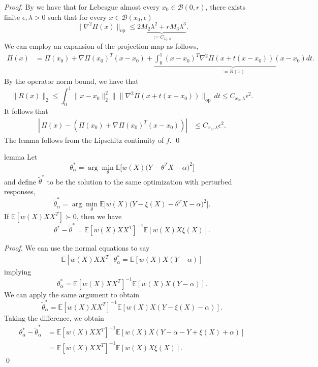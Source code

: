 \documentclass[11pt]{article}
\begin{document}
\noindent \textit{Proof.} By  we have that for Lebesgue almost every $x_0 \in \mathcal{B}(0,r)$, there exists finite $\epsilon, \lambda > 0$ such that for every $x \in \mathcal{B}(x_0, \epsilon)$
\[\|\nabla^2\Pi(x)\|_{\text{op}} \leq \underbrace{2M_2\lambda^{2}+rM_3\lambda^{3}}_{:= C_{x_0, \lambda}}.\]
We can employ an expansion of the projection map as follows,
\begin{align*}
    \Pi(x) &= \Pi(x_0) + \nabla\Pi(x_0)^{T}(x-x_0) + \underbrace{\int_{0}^{1}(x-x_0)^T\nabla^2\Pi(x+t(x-x_0))(x-x_0) dt}_{:= R(x)}.
\end{align*}
By the operator norm bound, we have that
\[\|R(x)\|_2 \leq \int_{0}^{1}\|x - x_0\|_2^2\|\|\nabla^2\Pi(x+t(x-x_0))\|_{\text{op}} \,dt \leq C_{x_0, \lambda}\epsilon^2.\]
It follows that 
\begin{align}
    \left|\,\Pi(x) - \left(\Pi(x_0) + \nabla\Pi(x_0)^{T}(x-x_0)\right)\right| &\leq C_{x_0, \lambda}\epsilon^2.
\end{align}
The lemma follows from the Lipschitz continuity of $f$. 
\qed{}


\begin{restatable}[Perturbation]{lemma}{} \label{lemma: perturbation}
    Let 
    \[\theta^*_{\alpha} = \arg\min_{\theta}\mathbb{E}\big[w(X)\big(Y - \theta^{T}X - \alpha\big)^2\big]\]
    and define $\tilde{\theta}^*$ to be the solution to the same optimization with perturbed responses,
    \[\tilde{\theta}^*_{\alpha} = \arg\min_{\theta}\mathbb{E}\big[w(X)\big(Y - \xi(X) - \theta^{T}X - \alpha\big)^2\big].\]
    If $\mathbb{E}[w(X)XX^T] \succ 0$, then we have
    \[\theta^* - \tilde{\theta}^* = \mathbb{E}[w(X)XX^{T}]^{-1}\mathbb{E}[w(X)X\xi(X)].\]
\end{restatable}
\noindent \textit{Proof.} We can use the normal equations to say
\begin{align*}
    \mathbb{E}[w(X)XX^{T}]\theta^*_{\alpha} = \mathbb{E}[w(X)X(Y-\alpha)]
\end{align*}
implying 
\[\theta^*_{\alpha} = \mathbb{E}[w(X)XX^{T}]^{-1}\mathbb{E}[w(X)X(Y-\alpha)].\]
We can apply the same argument to obtain 
\[\tilde{\theta}^*_{\alpha} = \mathbb{E}[w(X)XX^{T}]^{-1}\mathbb{E}[w(X)X(Y - \xi(X) -\alpha )].\]
Taking the difference, we obtain
\begin{align*}
    \theta^*_{\alpha} - \tilde{\theta}^*_{\alpha} &= \mathbb{E}[w(X)XX^{T}]^{-1}\mathbb{E}[w(X)X(Y - \alpha -  Y + \xi(X) +\alpha )] \\
    &= \mathbb{E}[w(X)XX^{T}]^{-1}\mathbb{E}[w(X)X\xi(X)].
\end{align*}
\qed{}
\end{document}
